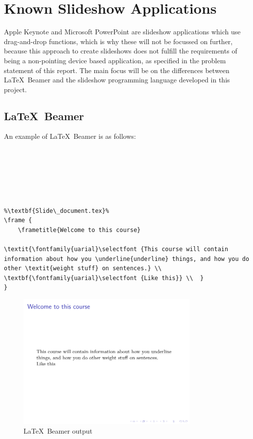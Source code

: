 \chapter{Known Slideshow Applications}
Apple Keynote and Microsoft PowerPoint are slideshow applications which use drag-and-drop functions, which is why these will not be focussed on further, because this approach to create slideshows does not fulfill the requirements of being a non-pointing device based application, as specified in the problem statement of this report. The main focus will be on the differences between \LaTeX~Beamer and the slideshow programming language developed in this project.

\section{\LaTeX~Beamer}
An example of \LaTeX~Beamer is as follows:

\begin{lstlisting}[frame=single, caption={Beamer example}, label=lst_beamer]
%\textbf{Main\_document.tex}%






%\textbf{Slide\_document.tex}%
\frame {
	\frametitle{Welcome to this course}

\textit{\fontfamily{uarial}\selectfont {This course will contain information about how you \underline{underline} things, and how you do other \textit{weight stuff} on sentences.} \\
\textbf{\fontfamily{uarial}\selectfont {Like this}} \\	}
}
\end{lstlisting}

\begin{figure}[H]
	\centering
		\includegraphics[width=0.8\textwidth]{text/beamer_example.pdf}
	\caption{\LaTeX~Beamer output}
	\label{fig:beamer_example}
\end{figure}

